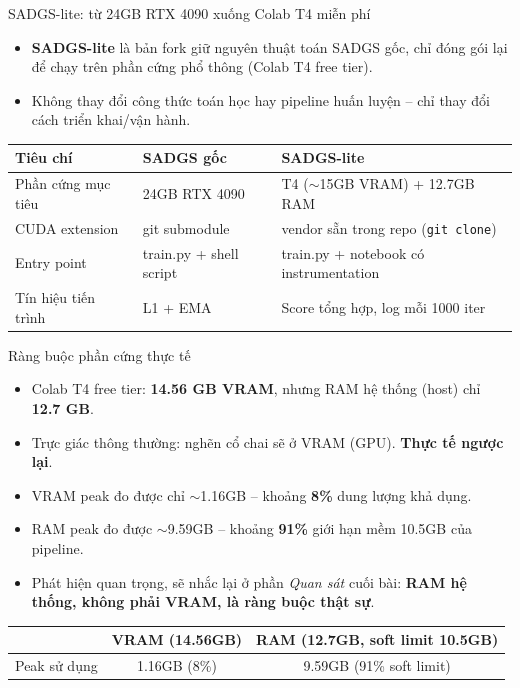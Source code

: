 
\begin{frame}{SADGS-lite: từ 24GB RTX 4090 xuống Colab T4 miễn phí}
\begin{itemize}
    \item \textbf{SADGS-lite} là bản fork giữ nguyên thuật toán SADGS gốc, chỉ đóng gói lại để chạy trên phần cứng phổ thông (Colab T4 free tier).
    \item Không thay đổi công thức toán học hay pipeline huấn luyện -- chỉ thay đổi cách triển khai/vận hành.
\end{itemize}
\vspace{0.3em}
\footnotesize
\begin{table}
\centering
\begin{tabular}{lll}
\toprule
\textbf{Tiêu chí} & \textbf{SADGS gốc} & \textbf{SADGS-lite} \\
\midrule
Phần cứng mục tiêu & 24GB RTX 4090 & T4 ($\sim$15GB VRAM) + 12.7GB RAM \\
CUDA extension & git submodule & vendor sẵn trong repo (\texttt{git clone}) \\
Entry point & train.py + shell script & train.py + notebook có instrumentation \\
Tín hiệu tiến trình & L1 + EMA & Score tổng hợp, log mỗi 1000 iter \\
\bottomrule
\end{tabular}
\end{table}
\end{frame}

\begin{frame}{Ràng buộc phần cứng thực tế}
\begin{itemize}
    \item Colab T4 free tier: \textbf{14.56 GB VRAM}, nhưng RAM hệ thống (host) chỉ \textbf{12.7 GB}.
    \item Trực giác thông thường: nghẽn cổ chai sẽ ở VRAM (GPU). \textbf{Thực tế ngược lại}.
    \item VRAM peak đo được chỉ $\sim$1.16GB -- khoảng \textbf{8\%} dung lượng khả dụng.
    \item RAM peak đo được $\sim$9.59GB -- khoảng \textbf{91\%} giới hạn mềm 10.5GB của pipeline.
    \item[$\Rightarrow$] Phát hiện quan trọng, sẽ nhắc lại ở phần \emph{Quan sát} cuối bài: \textbf{RAM hệ thống, không phải VRAM, là ràng buộc thật sự}.
\end{itemize}
\vspace{0.5em}
\centering
\footnotesize
\begin{tabular}{lcc}
\toprule
 & VRAM (14.56GB) & RAM (12.7GB, soft limit 10.5GB) \\
\midrule
Peak sử dụng & 1.16GB (8\%) & 9.59GB (91\% soft limit) \\
\bottomrule
\end{tabular}
\end{frame}

